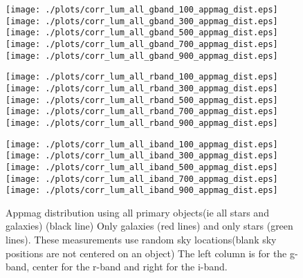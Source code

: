 \documentclass[10pt]{article}
\begin{document}
\begin{figure}
\centering
\begin{minipage}{0.32\textwidth}
 \texttt{[image: ./plots/corr\_lum\_all\_gband\_100\_appmag\_dist.eps]}
 \texttt{[image: ./plots/corr\_lum\_all\_gband\_300\_appmag\_dist.eps]}
 \texttt{[image: ./plots/corr\_lum\_all\_gband\_500\_appmag\_dist.eps]}
 \texttt{[image: ./plots/corr\_lum\_all\_gband\_700\_appmag\_dist.eps]}
 \texttt{[image: ./plots/corr\_lum\_all\_gband\_900\_appmag\_dist.eps]}
\end{minipage}
\begin{minipage}{0.32\textwidth}
 \texttt{[image: ./plots/corr\_lum\_all\_rband\_100\_appmag\_dist.eps]}
 \texttt{[image: ./plots/corr\_lum\_all\_rband\_300\_appmag\_dist.eps]}
 \texttt{[image: ./plots/corr\_lum\_all\_rband\_500\_appmag\_dist.eps]}
 \texttt{[image: ./plots/corr\_lum\_all\_rband\_700\_appmag\_dist.eps]}
 \texttt{[image: ./plots/corr\_lum\_all\_rband\_900\_appmag\_dist.eps]}
\end{minipage}
\begin{minipage}{0.32\textwidth}
 \texttt{[image: ./plots/corr\_lum\_all\_iband\_100\_appmag\_dist.eps]}
 \texttt{[image: ./plots/corr\_lum\_all\_iband\_300\_appmag\_dist.eps]}
 \texttt{[image: ./plots/corr\_lum\_all\_iband\_500\_appmag\_dist.eps]}
 \texttt{[image: ./plots/corr\_lum\_all\_iband\_700\_appmag\_dist.eps]}
 \texttt{[image: ./plots/corr\_lum\_all\_iband\_900\_appmag\_dist.eps]}
\end{minipage}
\caption{Appmag distribution using all primary objects(ie all stars and galaxies) (black line) 
Only galaxies (red lines) and only stars (green lines).
These measurements use random sky locations(blank sky positions are not centered on an object)
The left column is for the g-band, center for the r-band and right for the i-band.
}
\end{figure}
\end{document}
